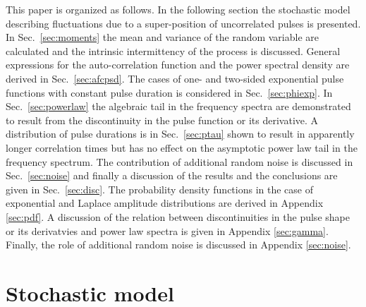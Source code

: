 \documentclass[aps,prb,12pt,a4paper,preprint,amsmath,amssymb,groupedaddress]{revtex4-1}
\newcommand{\Secref}[1]{Sec.~\ref{#1}}
\begin{document}
This paper is organized as follows. In the following section the stochastic model describing fluctuations due to a super-position of uncorrelated pulses is presented. In \Secref{sec:moments} the mean and variance of the random variable are calculated and the intrinsic intermittency of the process is discussed. General expressions for the auto-correlation function and the power spectral density are derived in \Secref{sec:afcpsd}. The cases of one- and two-sided exponential pulse functions with constant pulse duration is considered in \Secref{sec:phiexp}. In \Secref{sec:powerlaw} the algebraic tail in the frequency spectra are demonstrated to result from the discontinuity in the pulse function or its derivative. A distribution of pulse durations is in \Secref{sec:ptau} shown to result in apparently longer correlation times but has no effect on the asymptotic power law tail in the frequency spectrum. The contribution of additional random noise is discussed in \Secref{sec:noise} and finally a discussion of the results and the conclusions are given in \Secref{sec:disc}. The probability density functions in the case of exponential and Laplace amplitude distributions are derived in Appendix \ref{sec:pdf}. A discussion of the relation between discontinuities in the pulse shape or its derivatvies and power law spectra is given in Appendix \ref{sec:gamma}. Finally, the role of additional random noise is discussed in Appendix \ref{sec:noise}. 



\section{Stochastic model}\label{sec:model}
\end{document}

